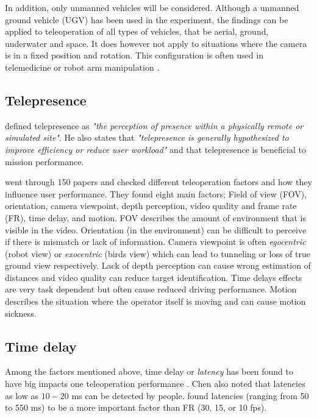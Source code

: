 In addition, only unmanned vehicles will be considered. Although a unmanned ground vehicle (UGV) has been used in the experiment, the findings can be applied to teleoperation of all types of vehicles, that be aerial, ground, underwater and space. It does however not apply to situations where the camera is in a fixed position and rotation. This configuration is often used in telemedicine \citep{Kumcu2017} or robot arm manipulation \citep{Bejczy1990}.

\subsection{Telepresence}

\citep{Draper1998} defined telepresence as \emph{"the perception of presence within a physically remote or simulated site"}. He also states that \emph{"telepresence is generally hypothesized to improve efficiency or reduce user workload"} and that telepresence is beneficial to mission performance.

\citep{Chen2007} went through 150 papers and checked different teleoperation factors and how they influence user performance. They found eight main factors; Field of view (FOV), orientation, camera viewpoint, depth perception, video quality and frame rate (FR), time delay, and motion. FOV describes the amount of environment that is visible in the video. Orientation (in the environment) can be difficult to perceive if there is mismatch or lack of information. Camera viewpoint is often \emph{egocentric} (robot view) or \emph{exocentric} (birds view) which can lead to tunneling or loss of true ground view respectively. Lack of depth perception can cause wrong estimation of distances and video quality can reduce target identification. Time delays effects are very task dependent but often cause reduced driving performance. Motion describes the situation where the operator itself is moving and can cause motion sickness.


\subsection{Time delay}
Among the factors mentioned above, time delay or \emph{latency} has been found to have big impacts one teleoperation performance \citep{Chen2007}. Chen also noted that latencies as low as $10-20$ ms can be detected by people. \citep{Arthur1993} found latencies (ranging from 50 to 550 ms) to be a more important factor than FR (30, 15, or 10 fps). 


